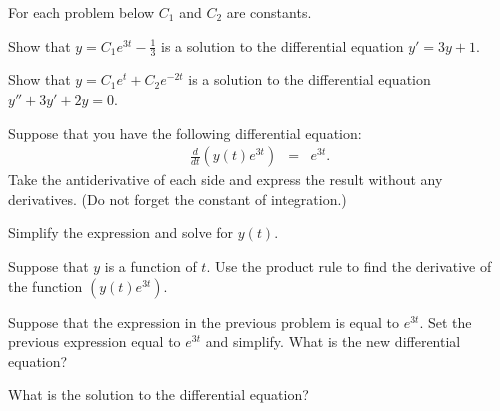   For each problem below $C_1$ and $C_2$ are constants.
  \begin{problem}

  \item Show that $y=C_1 e^{3t}-\frac{1}{3}$ is a solution to the
    differential equation $y'=3y+1$.
    \vfill

  \item Show that $y=C_1 e^{t} + C_2 e^{-2t}$ is a solution to the
    differential equation $y''+3y'+2y=0$.

    \vfill

    \clearpage

  \item Suppose that you have the following differential equation:
    \begin{eqnarray*}
      \frac{d}{dt} \left( y(t) e^{3t} \right) & = & e^{3t}.
    \end{eqnarray*}
    Take the antiderivative of each side and express the result
    without any derivatives. (Do not forget the constant of
    integration.)  
    
    \vfill

  \item Simplify the expression and solve for $y(t)$. 
    \vfill

    \clearpage

  \item Suppose that $y$ is a function of $t$. Use the product rule to
    find the derivative of the function $\left(y(t) e^{3t}\right)$.
    \vfill

  \item Suppose that the expression in the previous problem is equal
    to $e^{3t}$.  Set the previous expression equal to $e^{3t}$ and
    simplify. What is the new differential equation?
    \vfill

  \item What is the solution to the differential equation?

\end{problem}

